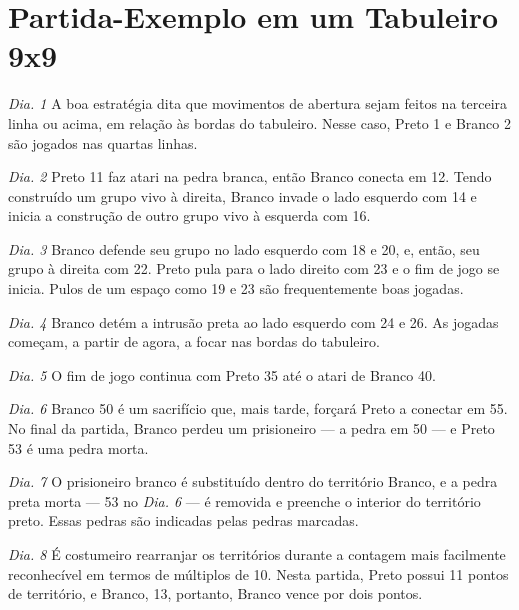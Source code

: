 \section{Partida-Exemplo em um Tabuleiro 9x9}

\emph{Dia. 1} A boa estratégia dita que movimentos de abertura sejam feitos na terceira linha ou acima, em relação às bordas do tabuleiro. Nesse caso, Preto 1 e Branco 2 são jogados nas quartas linhas.

\emph{Dia. 2} Preto 11 faz atari na pedra branca, então Branco conecta em 12. Tendo construído um grupo vivo à direita, Branco invade o lado esquerdo com 14 e inicia a construção de outro grupo vivo à esquerda com 16.

\emph{Dia. 3} Branco defende seu grupo no lado esquerdo com 18 e 20, e, então, seu grupo à direita com 22. Preto pula para o lado direito com 23 e o fim de jogo se inicia. Pulos de um espaço como 19 e 23 são frequentemente boas jogadas.

\emph{Dia. 4} Branco detém a intrusão preta ao lado esquerdo com 24 e 26. As jogadas começam, a partir de agora, a focar nas bordas do tabuleiro.

\emph{Dia. 5} O fim de jogo continua com Preto 35 até o atari de Branco 40.

\emph{Dia. 6} Branco 50 é um sacrifício que, mais tarde, forçará Preto a conectar em 55. No final da partida, Branco perdeu um prisioneiro --- a pedra em 50 --- e Preto 53 é uma pedra morta.

\emph{Dia. 7} O prisioneiro branco é substituído dentro do território Branco, e a pedra preta morta --- 53 no \emph{Dia. 6} --- é removida e preenche o interior do território preto. Essas pedras são indicadas pelas pedras marcadas.

\emph{Dia. 8} É costumeiro rearranjar os territórios durante a contagem mais facilmente reconhecível em termos de múltiplos de 10. Nesta partida, Preto possui 11 pontos de território, e Branco, 13, portanto, Branco vence por dois pontos.